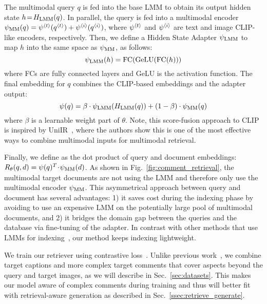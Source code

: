 The multimodal query $q$ is fed into the base LMM to obtain its output hidden state  $h\!=\!H_{\text{LMM}}(q)$.
In parallel, the query is fed into a multimodal encoder $\psi_{\text{MM}}(q) = \psi^{{\langle t\rangle}}(q^{{\langle t\rangle}}) + \psi^{{\langle i\rangle}}(q^{{\langle i\rangle}})$, where $\psi^{{\langle t\rangle}}$ and $\psi^{{\langle i\rangle}}$ are text and image CLIP-like encoders, respectively.
Then, we define a Hidden State Adapter $\psi_{\text{LMM}}$ to map $h$ into the same space as $\psi_{\text{MM}}$, as follows:
\begin{equation}
    \psi_{\text{LMM}}(h) = \text{FC}(\text{GeLU}(\text{FC}(h)))
\end{equation}
where FCs are fully connected layers and GeLU is the activation function.
The final embedding for $q$ combines the CLIP-based embeddings and the adapter output:
\begin{equation}
    \psi(q) = \beta \cdot \psi_{\text{LMM}}(H_{\text{LMM}}(q)) + (1-\beta) \cdot \psi_{\text{MM}}(q) \label{eq:mm_fusion}
\end{equation}
where $\beta$ is a learnable weight part of $\theta$.
%
Note, this score-fusion approach to CLIP is inspired by UniIR~\cite{wei2023uniir}, where the authors show this is one of the most effective ways to combine multimodal inputs for multimodal retrieval.

Finally, we define \retriever as the dot product of query and document embeddings: $R_\theta(q, d) = \psi(q)^T\!\cdot\!\psi_{\text{MM}}(d)$.
As shown in Fig.~\ref{fig:comment_retrieval}, the multimodal target documents are not using the LMM and therefore only use the multimodal encoder $\psi_{\text{MM}}$.
This asymmetrical approach between query and document has several advantages: 1) it saves cost during the indexing phase by avoiding to use an expensive LMM on the potentially large pool of multimodal documents, and 2) it bridges the domain gap between the queries and the database via fine-tuning of the adapter. 
In contrast with other methods that use LMMs for indexing~\cite{jiang2024vlm2vec, lin2024mmembeduniversalmultimodalretrieval}, our method keeps indexing lightweight.
%



We train our retriever using contrastive loss~\cite{radford2021clip}. Unlike previous work~\cite{wei2023uniir, lin2024mmembeduniversalmultimodalretrieval,jiang2024vlm2vec}, we combine target captions and more complex target comments that cover aspects beyond the query and target images, as we will describe in Sec.~\ref{sec:datasets}.
This makes our model aware of complex comments during training and thus will better fit with retrieval-aware generation as described in Sec.~\ref{ssec:retrieve_generate}.
%


